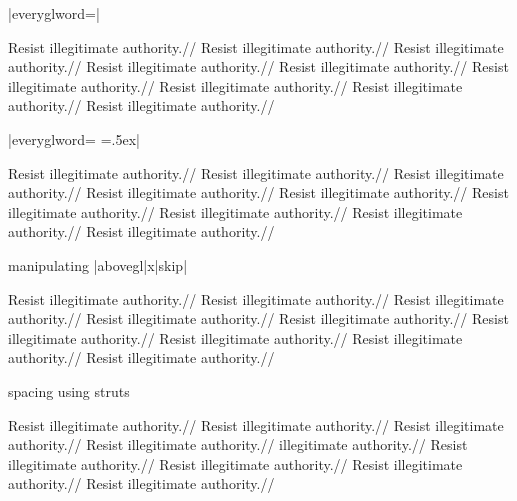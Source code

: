 \ex  |everyglword=\offinterlineskip|
\medskip

\leavevmode
\begingl[everygla=\ninerm,everyglb=\tenrm,
   everyglc=\elevenrm,everygld=\twelverm,everygle=\twelvebf,everyglf=\ninerm,
   everyglword=\offinterlineskip]
\gla Resist illegitimate authority.//
\glb Resist illegitimate authority.//
\glc Resist illegitimate authority.//
\gld Resist illegitimate authority.//
\gle Resist illegitimate authority.//
\gld Resist illegitimate authority.//
\glc Resist illegitimate authority.//
\glb Resist illegitimate authority.//
\glf Resist illegitimate authority.//
\endgl
\xe

\ex |everyglword={\baselineskip=0pt
\lineskip=.5ex}|
\smallskip

\leavevmode
\begingl[everygla=\ninerm,everyglb=\tenrm,
   everyglc=\elevenrm,everygld=\twelverm,everygle=\twelvebf,everyglf=\ninerm,
   everyglword={\baselineskip=0pt \lineskip=.5ex}]
\gla Resist illegitimate authority.//
\glb Resist illegitimate authority.//
\glc Resist illegitimate authority.//
\gld Resist illegitimate authority.//
\gle Resist illegitimate authority.//
\gld Resist illegitimate authority.//
\glc Resist illegitimate authority.//
\glb Resist illegitimate authority.//
\glf Resist illegitimate authority.//
\endgl
\xe

\ex manipulating |abovegl|x|skip|
\smallskip

\leavevmode
\begingl[everygla=\ninerm,everyglb=\tenrm,
   everyglc=\elevenrm,everygld=\twelverm,everygle=\twelvebf,everyglf=\ninerm,
   everyglword={\baselineskip=0pt \lineskip=.3ex}]
\gla Resist illegitimate authority.//
\glb Resist illegitimate authority.//
\glc Resist illegitimate authority.//
\gld Resist illegitimate authority.//
\gle[abovegleskip=2ex] Resist illegitimate authority.//
\gld[abovegldskip=2ex] Resist illegitimate authority.//
\glc Resist illegitimate authority.//
\glb Resist illegitimate authority.//
\glf Resist illegitimate authority.//
\endgl
\xe

\ex spacing using struts
\smallskip

\leavevmode
\begingl[everygla=\ninerm,everyglb=\tenrm,
   everyglc=\elevenrm,everygld=\twelverm,everygle=\twelvebf,everyglf=\ninerm,
   everyglword={\baselineskip=0pt \lineskip=.3ex}]
\gla Resist illegitimate authority.//
\glb Resist illegitimate authority.//
\glc Resist illegitimate authority.//
\gld Resist illegitimate authority.//
 illegitimate authority.//
\gld Resist illegitimate authority.//
\glc Resist illegitimate authority.//
\glb Resist illegitimate authority.//
\glf Resist illegitimate authority.//
\endgl
\xe



